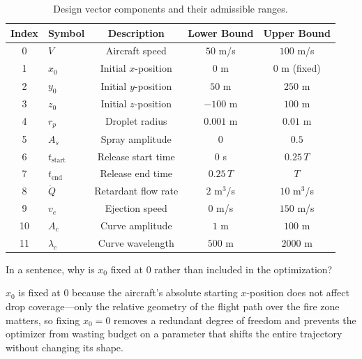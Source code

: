 \documentclass{article}
\begin{document}
\begin{enumerate}
\begin{table}[H]
\centering
\caption{Design vector components and their admissible ranges.}
\label{tab:lam}
\begin{tabular}{clccc}
\toprule
Index & Symbol & Description & Lower Bound & Upper Bound \\
\midrule
0  & $V$             & Aircraft speed              & $50$ m/s & $100$ m/s \\
1  & $x_0$           & Initial $x$-position        & $0$ m              & $0$ m (fixed)       \\
2  & $y_0$           & Initial $y$-position        & $50$ m              & $250$ m             \\
3  & $z_0$           & Initial $z$-position        & $-100$ m           & $100$ m             \\
4  & $r_p$           & Droplet radius              & $0.001$ m          & $0.01$ m            \\
5  & $A_s$           & Spray amplitude             & $0$                & $0.5$               \\
6  & $t_\text{start}$& Release start time          & $0$ s              & $0.25\,T$           \\
7  & $t_\text{end}$  & Release end time            & $0.25\,T$          & $T$                 \\
8  & $\dot{Q}$       & Retardant flow rate         & $2$ m$^3$/s        & $10$ m$^3$/s        \\
9  & $v_e$           & Ejection speed              & $0$ m/s            & $150$ m/s           \\
10 & $A_c$           & Curve amplitude             & $1$ m              & $100$ m             \\
11 & $\lambda_c$     & Curve wavelength            & $500$ m            & $2000$ m            \\
\bottomrule
\end{tabular}
\end{table}

In a sentence, why is $x_0$ fixed at $0$ rather than included in the optimization?

\begin{answer}
$x_0$ is fixed at 0 because the aircraft's absolute starting $x$-position does not affect drop coverage---only the relative geometry of the flight path over the fire zone matters, so fixing $x_0 = 0$ removes a redundant degree of freedom and prevents the optimizer from wasting budget on a parameter that shifts the entire trajectory without changing its shape.
\end{answer}


\end{enumerate}
\end{document}
